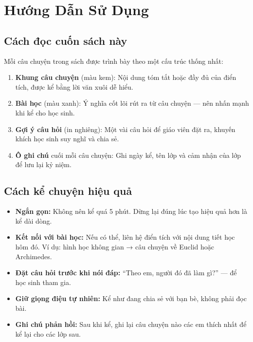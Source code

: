 \chapter*{Hướng Dẫn Sử Dụng}

\section*{Cách đọc cuốn sách này}

Mỗi câu chuyện trong sách được trình bày theo một cấu trúc thống nhất:

\begin{enumerate}[leftmargin=2cm, label=\textcolor{truyenred}{\textbf{\arabic*.}}]
  \item \textbf{Khung câu chuyện} (màu kem): Nội dung tóm tắt hoặc đầy đủ của
        điển tích, được kể bằng lời văn xuôi dễ hiểu.
  \item \textbf{Bài học} (màu xanh): Ý nghĩa cốt lõi rút ra từ câu chuyện ---
        nên nhấn mạnh khi kể cho học sinh.
  \item \textbf{Gợi ý câu hỏi} (in nghiêng): Một vài câu hỏi để giáo viên đặt ra,
        khuyến khích học sinh suy nghĩ và chia sẻ.
  \item \textbf{Ô ghi chú} cuối mỗi câu chuyện: Ghi ngày kể, tên lớp và
        cảm nhận của lớp để lưu lại kỷ niệm.
\end{enumerate}

\section*{Cách kể chuyện hiệu quả}

\begin{tcolorbox}[
  enhanced, breakable,
  colback=truyenblue!5, colframe=truyenblue!40,
  arc=6pt, title={\bfseries\color{white} Bí quyết kể chuyện trên lớp},
  fonttitle=\bfseries, coltitle=white,
  attach boxed title to top left={yshift=-2mm, xshift=6mm},
  boxed title style={colback=truyenblue, arc=4pt}
]
  \begin{itemize}[leftmargin=1.5cm, itemsep=4pt]
    \item \textbf{Ngắn gọn:} Không nên kể quá 5 phút. Dừng lại đúng lúc
          tạo hiệu quả hơn là kể dài dòng.
    \item \textbf{Kết nối với bài học:} Nếu có thể, liên hệ điển tích với
          nội dung tiết học hôm đó. Ví dụ: hình học không gian → câu chuyện
          về Euclid hoặc Archimedes.
    \item \textbf{Đặt câu hỏi trước khi nói đáp:} ``Theo em, người đó đã làm
          gì?'' --- để học sinh tham gia.
    \item \textbf{Giữ giọng điệu tự nhiên:} Kể như đang chia sẻ với bạn bè,
          không phải đọc bài.
    \item \textbf{Ghi chú phản hồi:} Sau khi kể, ghi lại câu chuyện nào các
          em thích nhất để kể lại cho các lớp sau.
  \end{itemize}
\end{tcolorbox}

